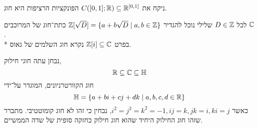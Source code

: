 \begin{example}
	ניקח את $C([0, 1]; \mathbb{R}) \subseteq \mathbb{R}^{[0, 1]}$ הפונקציות הרציפות היא חוג.
\end{example}
\begin{example}
	לכל $D \in \mathbb{Z}$ שלילי נוכל להגדיר $\mathbb{Z}[\sqrt{D}] = \{ a + b \sqrt{D} \mid a, b \in \mathbb{Z} \}$ כתת־חוג של המרוכבים $\mathbb{C}$. \\*
	בפרט $\mathbb{Z}[i] \subseteq \mathbb{C}$ נקרא חוג השלמים של גאוס.
\end{example}
נבחן עתה חוגי חילוק,
\[
	\mathbb{R} \subseteq \mathbb{C} \subseteq \mathbb{H}
\]
חוג הקוורטרניונים, המוגדר על־ידי
\[
	\mathbb{H} = \{ a + bi + cj + dk \mid a, b, c, d \in \mathbb{R} \}
\]
כאשר $i^2 = j^2 = k^2 = -1, ij = k, jk = i, ki = j$, נבחין כי זהו לא חוג קומוטטיבי.
מתברר שזהו חוג החילוק היחיד שהוא חוג חילוק כחזקה סופית של שדה הממשיים.

